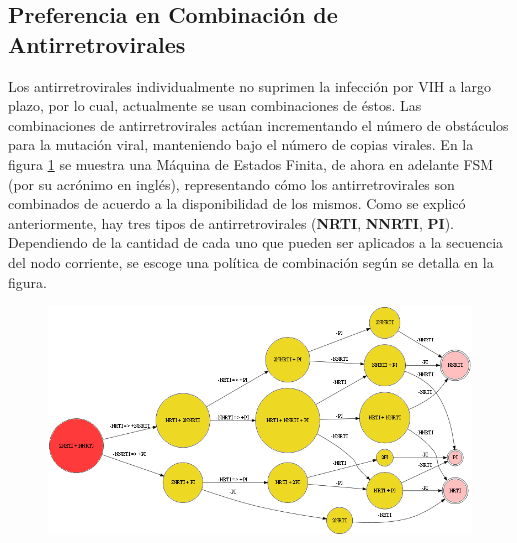 \subsection{Preferencia en Combinaci\'on de Antirretrovirales}
Los antirretrovirales individualmente no suprimen la infecci\'on por VIH a largo plazo, por lo cual, actualmente se usan combinaciones de \'estos.
Las combinaciones de antirretrovirales act\'uan incrementando el n\'umero de obst\'aculos para la mutaci\'on viral, manteniendo bajo el n\'umero de
copias virales. En la figura \ref{antivirals_fsm} se muestra una M\'aquina de Estados Finita, de ahora en adelante FSM (por su acr\'onimo en
ingl\'es), representando c\'omo los antirretrovirales son combinados de acuerdo a la disponibilidad de los mismos. Como se explic\'o anteriormente, 
hay tres tipos de antirretrovirales (\textbf{NRTI}, \textbf{NNRTI}, \textbf{PI}). Dependiendo de la cantidad de cada uno que pueden ser aplicados a
la secuencia del nodo corriente, se escoge una pol\'itica de combinaci\'on seg\'un se detalla en la figura.

\begin{figure}[ht]
  \centering
  \includegraphics[width=\linewidth]{images/Antivirals_fsm.png}
  \label{antivirals_fsm}
\end{figure}

